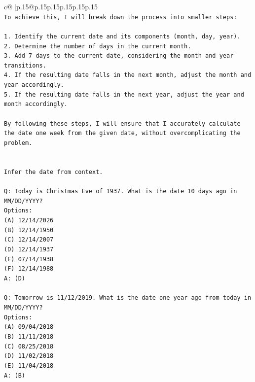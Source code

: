 \documentclass{article}
\begin{document}
{\begin{supertabular}{c@{$\;$}|p{.15\linewidth}@{}p{.15\linewidth}p{.15\linewidth}p{.15\linewidth}p{.15\linewidth}p{.15\linewidth}}
{{{\\ 
\texttt{To achieve this, I will break down the process into smaller steps:} \\
\\ 
\texttt{1. Identify the current date and its components (month, day, year).} \\
\texttt{2. Determine the number of days in the current month.} \\
\texttt{3. Add 7 days to the current date, considering the month and year transitions.} \\
\texttt{4. If the resulting date falls in the next month, adjust the month and year accordingly.} \\
\texttt{5. If the resulting date falls in the next year, adjust the year and month accordingly.} \\
\\ 
\texttt{By following these steps, I will ensure that I accurately calculate the date one week from the given date, without overcomplicating the problem.} \\
\\ 
\\ 
\texttt{Infer the date from context.} \\
\\ 
\texttt{Q: Today is Christmas Eve of 1937. What is the date 10 days ago in MM/DD/YYYY?} \\
\texttt{Options:} \\
\texttt{(A) 12/14/2026} \\
\texttt{(B) 12/14/1950} \\
\texttt{(C) 12/14/2007} \\
\texttt{(D) 12/14/1937} \\
\texttt{(E) 07/14/1938} \\
\texttt{(F) 12/14/1988} \\
\texttt{A: (D)} \\
\\ 
\texttt{Q: Tomorrow is 11/12/2019. What is the date one year ago from today in MM/DD/YYYY?} \\
\texttt{Options:} \\
\texttt{(A) 09/04/2018} \\
\texttt{(B) 11/11/2018} \\
\texttt{(C) 08/25/2018} \\
\texttt{(D) 11/02/2018} \\
\texttt{(E) 11/04/2018} \\
\texttt{A: (B)} \\
\\ 
}}}
\end{supertabular}}
\end{document}
